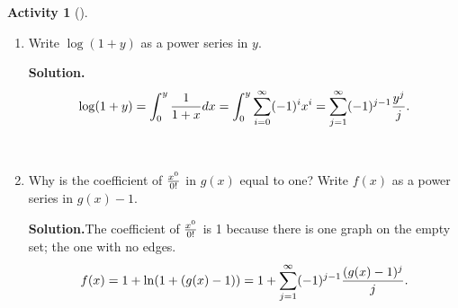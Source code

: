 \documentclass[10pt,]{book}
\theoremstyle{plain}
\theoremstyle{definition}
\newtheorem{activity}[project]{Activity}
\numberwithin{equation}{chapter}
\begin{document}
\begin{activity}[]
\begin{enumerate}[label=(\alph*)]
~\par
\item Write \(\log(1+y)\) as a power series in \(y\).%
\par\medskip\noindent%
\textbf{Solution.}\quad %
\begin{equation*}
\log(1+y)=\int_0^y {1\over 1+x}dx =\int_0^y \sum_{i=0}^\infty
(-1)^ix^i = \sum_{j=1}^\infty (-1)^{j-1}{y^j\over j}.
\end{equation*}

~\par
\item Why is the coefficient of \(x^0\over 0!\) in \(g(x)\) equal to one?  Write \(f(x)\) as a power series in \(g(x) -1\).%
\par\medskip\noindent%
\textbf{Solution.}\quad The coefficient of \(x^0\over 0!\) is 1 because there is one graph on the empty set; the one with no edges.%
\begin{equation*}
f(x) = 1 +\ln(1 +
(g(x)-1))=1+\sum_{j=1}^\infty (-1)^{j-1}{(g(x)-1)^j\over j}.
\end{equation*}
%


\end{enumerate}
\end{activity}
\end{document}
